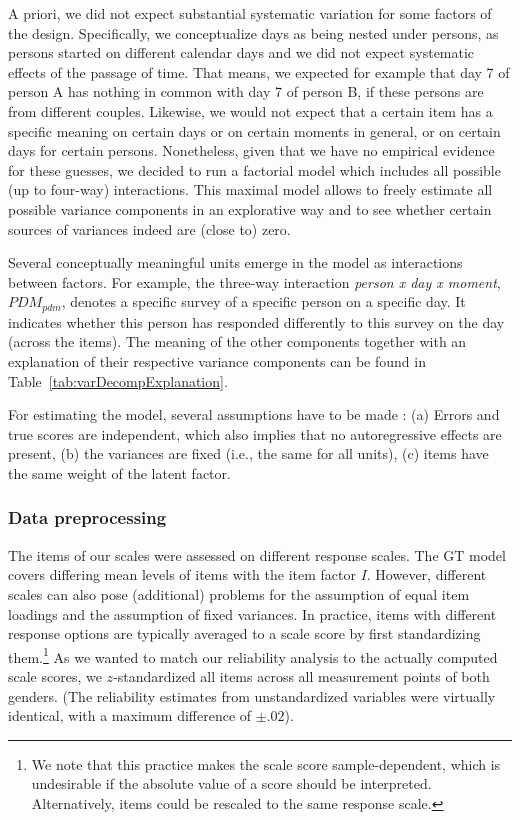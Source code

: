 \documentclass[jou,a4paper,draftfirst]{apa6}\usepackage[]{graphicx}\usepackage[]{color}
\begin{document}
A priori, we did not expect substantial systematic variation for some factors of the design. Specifically, we conceptualize days as being nested under persons, as persons started on different calendar days and we did not expect systematic effects of the passage of time. That means, we expected for example that day 7 of person A has nothing in common with day 7 of person B, if these persons are from different couples. Likewise, we would not expect that a certain item has a specific meaning on certain days or on certain moments in general, or on certain days for certain persons. Nonetheless, given that we have no empirical evidence for these guesses, we decided to run a factorial model which includes all possible (up to four-way) interactions. This maximal model allows to freely estimate all possible variance components in an explorative way and to see whether certain sources of variances indeed are (close to) zero.

Several conceptually meaningful units emerge in the model as interactions between factors. For example, the three-way interaction \emph{person x day x moment}, $PDM_{pdm}$, denotes a specific survey of a specific person on a specific day. It indicates whether this person has responded differently to this survey on the day (across the items). The meaning of the other components together with an explanation of their respective variance components can be found in Table~\ref{tab:varDecompExplanation}.

For estimating the model, several assumptions have to be made \parencite{shrout_Psychometrics_2012}: (a) Errors and true scores are independent, which also implies that no autoregressive effects are present, (b) the variances are fixed (i.e., the same for all units), (c) items have the same weight of the latent factor.

\subsubsection{Data preprocessing}
The items of our scales were assessed on different response scales. The GT model covers differing mean levels of items with the item factor $I$. However, different scales can also pose (additional) problems for the assumption of equal item loadings and the assumption of fixed variances. In practice, items with different response options are typically averaged to a scale score by first standardizing them.\footnote{We note that this practice makes the scale score sample-dependent, which is undesirable if the absolute value of a score should be interpreted. Alternatively, items could be rescaled to the same response scale.} As we wanted to match our reliability analysis to the actually computed scale scores, we $z$-standardized all items across all measurement points of both genders. (The reliability estimates from unstandardized variables were virtually identical, with a maximum difference of $\pm.02$).
\end{document}
